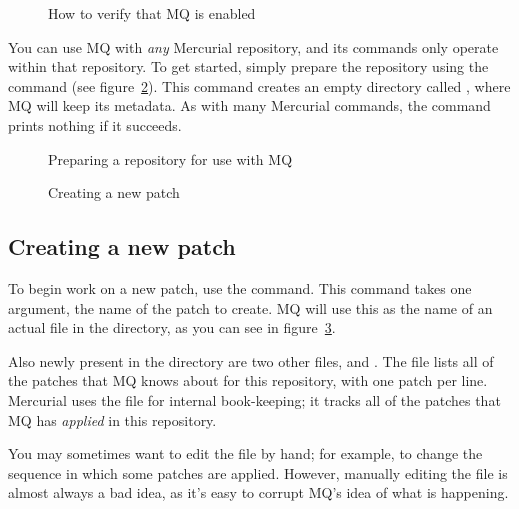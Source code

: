 \begin{figure}[ht]
  \caption{How to verify that MQ is enabled}
  \label{ex:mq:enabled}
\end{figure}

You can use MQ with \emph{any} Mercurial repository, and its commands
only operate within that repository.  To get started, simply prepare
the repository using the  command (see
figure~\ref{ex:mq:qinit}).  This command creates an empty directory
called , where MQ will keep its metadata.  As
with many Mercurial commands, the  command prints nothing
if it succeeds.

\begin{figure}[ht]
  \caption{Preparing a repository for use with MQ}
  \label{ex:mq:qinit}
\end{figure}

\begin{figure}[ht]
  \caption{Creating a new patch}
  \label{ex:mq:qnew}
\end{figure}

\subsection{Creating a new patch}

To begin work on a new patch, use the  command.  This
command takes one argument, the name of the patch to create.  MQ will
use this as the name of an actual file in the 
directory, as you can see in figure~\ref{ex:mq:qnew}.

Also newly present in the  directory are two
other files,  and .  The
 file lists all of the patches that MQ knows about
for this repository, with one patch per line.  Mercurial uses the
 file for internal book-keeping; it tracks all of the
patches that MQ has \emph{applied} in this repository.

\begin{note}
  You may sometimes want to edit the  file by hand;
  for example, to change the sequence in which some patches are
  applied.  However, manually editing the  file is
  almost always a bad idea, as it's easy to corrupt MQ's idea of what
  is happening.
\end{note}


